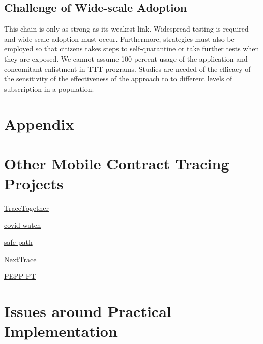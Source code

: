 \documentclass{article}
\begin{document}
\subsection{Challenge of Wide-scale Adoption}
This chain is only as strong as its weakest link.  Widespread testing is required and wide-scale adoption must occur. Furthermore, strategies must also be employed so that citizens takes steps to self-quarantine or take further tests when they are exposed. We cannot assume 100 percent usage of the application and concomitant enlistment in TTT programs.  Studies are needed of the efficacy of the sensitivity of the effectiveness of the approach to to different levels of subscription in a population.

\newpage
\appendix

\section*{Appendix}

\section{Other Mobile Contract Tracing Projects}\label{sect:apps}

\href{https://www.tracetogether.gov.sg/}{TraceTogether}

\href{https://www.covid-watch.org/article}{covid-watch}

\href{http://safepaths.mit.edu/}{safe-path}

\href{https://nexttrace.org/about}{NextTrace}

\href{https://www.pepp-pt.org/}{PEPP-PT}


\section{Issues around Practical Implementation}
\end{document}
